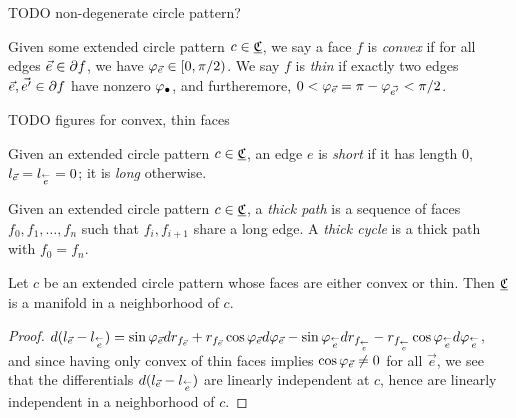 TODO non-degenerate circle pattern?


\begin{definition}
Given some extended circle pattern $c \in {\underline{\mathfrak{C}}}$,
we say a face $f$ is \emph{convex} if for all edges $\vec{e} \in \partial f$,
we have $\varphi_{\vec{e}} \in [0,\pi/2)$.
We say $f$ is \emph{thin} if exactly two edges $\vec{e}, \vec{e'} \in \partial f$
have nonzero $\varphi_{\bullet}$, and furtheremore,
	$0 < \varphi_{\vec{e}} = \pi - \varphi_{\vec{e'}} < \pi/2$.
\end{definition}

TODO figures for convex, thin faces

\begin{definition}
Given an extended circle pattern $c\in {\underline{\mathfrak{C}}}$, an edge $e$ is \emph{short}
if it has length 0, $l_{\vec{e}} = l_{\overset{\leftarrow}{e}} = 0$;
it is \emph{long} otherwise.
\end{definition}


\begin{definition}
Given an extended circle pattern $c\in {\underline{\mathfrak{C}}}$, a \emph{thick path}
is a sequence of faces $f_0,f_1,\ldots,f_n$
such that $f_i,f_{i+1}$ share a long edge.
A \emph{thick cycle} is a thick path with $f_0 = f_n$.
\end{definition}



\begin{lemma}
Let $c$ be an extended circle pattern whose faces are either
convex or thin.
Then ${\underline{\mathfrak{C}}}$ is a manifold in a neighborhood of $c$.
\end{lemma}

\begin{proof}
$d(l_{\vec{e}} - l_{\overset{\leftarrow}{e}})
= \sin \varphi_{\vec{e}} d r_{f_{\vec{e}}}
+ r_{f_{\vec{e}}} \cos \varphi_{\vec{e}} d \varphi_{\vec{e}}
- \sin \varphi_{\overset{\leftarrow}{e}} d r_{f_{\overset{\leftarrow}{e}}}
- r_{f_{\overset{\leftarrow}{e}}} \cos \varphi_{\overset{\leftarrow}{e}} d \varphi_{\overset{\leftarrow}{e}}
$,
and since having only convex of thin faces implies
$\cos \varphi_{\vec{e}} \neq 0$ for all $\vec{e}$,
we see that the differentials $d(l_{\vec{e}} - l_{\overset{\leftarrow}{e}})$
are linearly independent at $c$,
hence are linearly independent in a neighborhood of $c$.
\end{proof}


